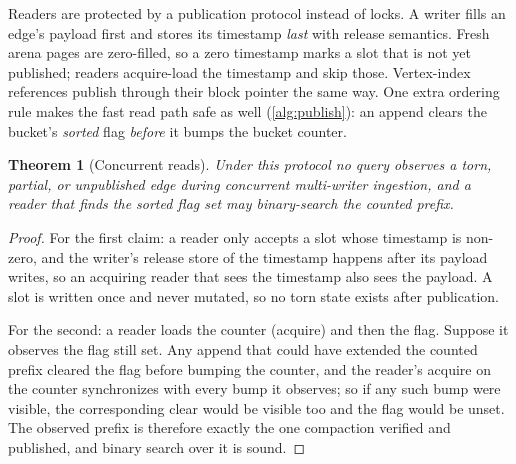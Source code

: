 \documentclass[letterpaper,twocolumn,10pt]{article}
\newtheorem{theorem}{Theorem}
\begin{document}
Readers are protected by a publication protocol instead of locks. A
writer fills an edge's payload first and stores its timestamp
\emph{last} with release semantics. Fresh arena pages are zero-filled,
so a zero timestamp marks a slot that is not yet published; readers
acquire-load the timestamp and skip those. Vertex-index references
publish through their block pointer the same way. One extra ordering
rule makes the fast read path safe as well (\cref{alg:publish}): an
append clears the bucket's \emph{sorted} flag \emph{before} it bumps
the bucket counter.

\begin{algorithm}[t]
\small
\DontPrintSemicolon
{}
\Fn{\textsc{Expand}$(v, t_{lo}, t_{hi})$}{
  \ForEach{bucket $b$ of $v$}{
    $n \leftarrow b.\mathit{count}$ \hfill \textsf{(acquire)}\;
    \lIf{$b.\mathit{sorted}$ \textsf{(acquire)}}{binary-search $b[0..n)$}
    \lElse{scan $b[0..n)$, skipping $t = 0$}
  }
}
\caption{Publication protocol. The two release stores and the order of
lines 3--4 are what \cref{thm:conc} rests on: clearing \emph{sorted}
before bumping \emph{count} is what lets a reader trust a binary
search, and storing $t$ last is what makes a half-written slot
invisible.}
\label{alg:publish}
\end{algorithm}

\begin{theorem}[Concurrent reads]
\label{thm:conc}
Under this protocol no query observes a torn, partial, or unpublished
edge during concurrent multi-writer ingestion, and a reader that finds
the sorted flag set may binary-search the counted prefix.
\end{theorem}
\begin{proof}
For the first claim: a reader only accepts a slot whose timestamp is
non-zero, and the writer's release store of the timestamp happens
after its payload writes, so an acquiring reader that sees the
timestamp also sees the payload. A slot is written once and never
mutated, so no torn state exists after publication.

For the second: a reader loads the counter (acquire) and then the
flag. Suppose it observes the flag still set. Any append that could
have extended the counted prefix cleared the flag before bumping the
counter, and the reader's acquire on the counter synchronizes with
every bump it observes; so if any such bump were visible, the
corresponding clear would be visible too and the flag would be unset.
The observed prefix is therefore exactly the one compaction verified
and published, and binary search over it is sound.
\end{proof}
\end{document}
